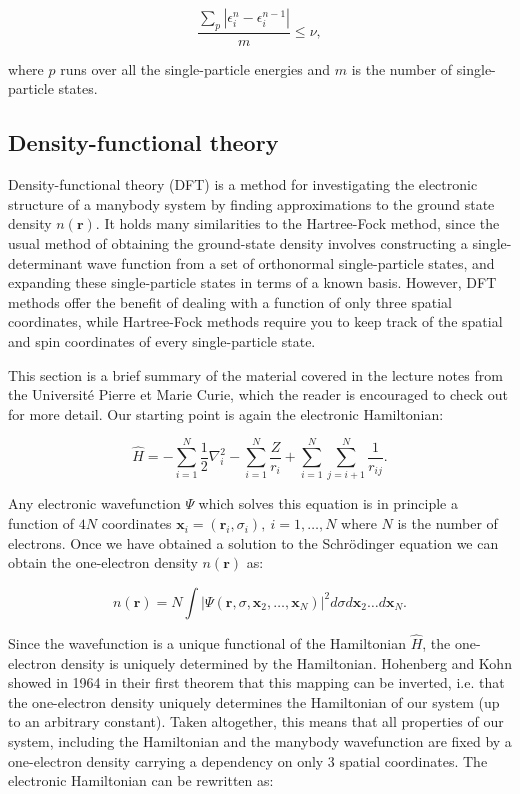 \begin{equation}
\frac{\sum_p \left| \epsilon_i^n - \epsilon_i^{n-1} \right|}
{m} \leq \nu ,
\end{equation}

where $p$ runs over all the single-particle energies and
$m$ is the number of single-particle states.

\subsection{Density-functional theory}
Density-functional theory (DFT) is a method for
investigating the electronic structure of a manybody system
by finding approximations to the ground state
density $n(\bm{r})$.
It holds many similarities to the Hartree-Fock method,
since the usual method of obtaining the ground-state density
involves constructing a single-determinant wave function
from a set of orthonormal single-particle states,
and expanding these single-particle states in terms
of a known basis. However, DFT methods
offer the benefit of dealing with a function of only
three spatial coordinates, while Hartree-Fock methods
require you to keep track of the spatial and spin coordinates
of every single-particle state.
\par
This section is a brief summary of the material covered
in the \parencite[Toulouse][pages 1-12]{toulouse2017}
lecture notes from the Université Pierre et Marie Curie,
which the reader is encouraged to check out for more detail.
Our starting point is again the electronic Hamiltonian:

\begin{equation}
    \hat{H} = -\sum_{i=1}^N \frac{1}{2} \nabla_i^2
    - \sum_{i=1}^N \frac{Z}{r_{i}} + \sum_{i=1}^N \sum_{j=i+1}^N
    \frac{1}{r_{ij}} .
\end{equation}

Any electronic wavefunction $\Psi$ which solves this equation
is in principle a function of $4N$ coordinates $\bm{x}_i = (\bm{r}_i, \sigma_i)
, \ i=1,\dots,N$
where $N$ is the number of electrons.
Once we have obtained a solution to the Schr\"{o}dinger equation
we can obtain the one-electron density $n(\bm{r})$ as:

\begin{equation}
    n(\bm{r}) = N \int \left| \Psi(\bm{r}, \sigma, \bm{x}_2,\dots,\bm{x}_N)
    \right|^2 d\sigma d\bm{x}_2 \dots d\bm{x}_N .
\end{equation}

Since the wavefunction is a unique functional of the Hamiltonian
$\hat{H}$, the one-electron density is uniquely determined
by the Hamiltonian. Hohenberg and Kohn showed in 1964
\cite{hohenberg1964inhomogeneous} in their first theorem that this mapping
can be inverted, i.e. that the one-electron density uniquely
determines the Hamiltonian of our system (up to an arbitrary constant).
Taken altogether, this means that all properties of our system, including
the Hamiltonian and the manybody wavefunction are fixed
by a one-electron density carrying a dependency on only 3 spatial coordinates.
The electronic Hamiltonian can be rewritten as:

